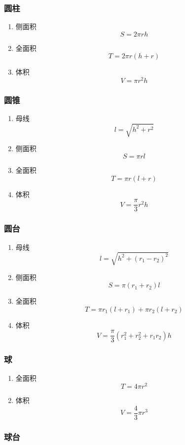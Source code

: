 \documentclass[a4paper]{ctexart}
\begin{document}
\subsubsection{圆柱}

\begin{enumerate}
	\item 侧面积
	$$S=2\pi rh$$
	\item 全面积
	$$T=2\pi r(h+r)$$
	\item 体积
	$$V=\pi r^2h$$
\end{enumerate}

\subsubsection{圆锥}

\begin{enumerate}
	\item 母线
	$$l=\sqrt{h^2+r^2}$$
	\item 侧面积
	$$S=\pi rl$$
	\item 全面积
	$$T=\pi r(l+r)$$
	\item 体积
	$$V=\frac{\pi}{3} r^2h$$
\end{enumerate}

\subsubsection{圆台}

\begin{enumerate}
	\item 母线
	$$l=\sqrt{h^2+(r_1-r_2)^2}$$
	\item 侧面积
	$$S=\pi(r_1+r_2)l$$
	\item 全面积
	$$T=\pi r_1(l+r_1)+\pi r_2(l+r_2)$$
	\item 体积
	$$V=\frac{\pi}{3}(r_1^2+r_2^2+r_1r_2)h$$
\end{enumerate}

\subsubsection{球}

\begin{enumerate}
	\item 全面积
	$$T=4\pi r^2$$
	\item 体积
	$$V=\frac{4}{3}\pi r^3$$
\end{enumerate}

\subsubsection{球台}
\end{document}
